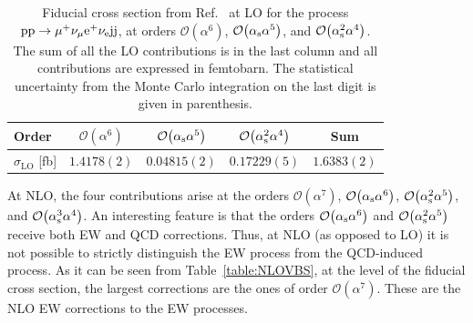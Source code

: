 \begin{table}
\begin{center}
\begin{tabular}{|l||c|c|c||c|}
\hline
Order & $\mathcal{O}{\left(\alpha^{6}\right)}$ & $\mathcal{O}{\left(\alpha_{\rm s}\alpha^{5}\right)}$ & $\mathcal{O}{\left(\alpha_{\rm s}^2\alpha^{4}\right)}$ & Sum \\
\hline
\hline
${\sigma_{\mathrm{LO}}}$ [fb] 
& $1.4178(2)$
& $0.04815(2)$
& $0.17229(5)$
& $1.6383(2)$ \\
\hline
\end{tabular}
\end{center}
\caption{
Fiducial cross section from Ref.~\cite{Biedermann:2017bss} at LO for the process ${\rm p}{\rm p}\to\mu^+\nu_\mu{\rm e}^+\nu_{\rm e}{\rm j}{\rm j}$, at
orders  $\mathcal{O}{\left(\alpha^{6}\right)}$, $\mathcal{O}{\left(\alpha_{\rm s}\alpha^{5}\right)}$, and $\mathcal{O}{\left(\alpha_{\rm s}^2\alpha^{4}\right)}$.
The sum of all the LO contributions is in the last column and all contributions are expressed in femtobarn. 
The statistical uncertainty from the Monte Carlo integration on the last digit is given in parenthesis.}
\label{table:LOVBS}
\end{table}

At NLO, the four contributions arise at the orders $\mathcal{O}{\left(\alpha^{7}\right)}$, $\mathcal{O}{\left(\alpha_{\rm s}\alpha^{6}\right)}$, $\mathcal{O}{\left(\alpha_{\rm s}^{2}\alpha^{5}\right)}$, and $\mathcal{O}{\left(\alpha_{\rm s}^{3}\alpha^{4}\right)}$. 
An interesting feature is that the orders $\mathcal{O}{\left(\alpha_{\rm s}\alpha^{6}\right)}$ and $\mathcal{O}{\left(\alpha_{\rm s}^{2}\alpha^{5}\right)}$ receive both EW and QCD corrections.
Thus, at NLO (as opposed to LO) it is not possible to strictly distinguish the EW process from the QCD-induced process.
As it can be seen from Table~\ref{table:NLOVBS}, at the level of the fiducial cross section, the largest corrections are the ones of order $\mathcal{O}{\left(\alpha^{7}\right)}$.
These are the NLO EW corrections to the EW processes.


